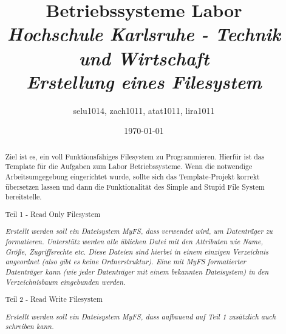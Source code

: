 	\title{Betriebssysteme Labor \\
		\textit{Hochschule Karlsruhe - Technik und Wirtschaft }\\
		\textit{Erstellung eines Filesystem}
	}
	\author{selu1014, zach1011, atat1011, lira1011}
	\date{\today}
	\maketitle
	\newpage

	\renewcommand{\abstractname}{Zielsetzung}
	\begin{abstract}
		Ziel ist es, ein voll Funktionsfähiges Filesystem zu Programmieren. Hierfür ist das Template für die Aufgaben zum Labor Betriebssysteme. Wenn die notwendige Arbeitsumgegebung eingerichtet wurde, sollte sich das Template-Projekt korrekt übersetzen lassen und dann die Funktionalität des Simple and Stupid File System bereitstelle. 
		\newline
		\noindent \begin{center}Teil 1 - Read Only Filesystem \end{center}
		\noindent \textit{Erstellt werden soll ein Dateisystem MyFS, dass verwendet wird, um Datenträger zu formatieren. Unterstütz werden alle üblichen Datei mit den Attributen wie Name, Größe, Zugriffsrechte etc. Diese Dateien sind hierbei in einem einzigen Verzeichnis angeordnet (also gibt es keine Ordnerstruktur). Eine mit MyFS formatierter Datenträger kann (wie jeder Datenträger mit einem bekannten Dateisystem) in den Verzeichnisbaum eingebunden werden.} 
		\newline
		\noindent \begin{center}Teil 2 - Read Write Filesystem \end{center}
		\noindent \textit{Erstellt werden soll ein Dateisystem MyFS, dass aufbauend auf Teil 1 zusätzlich auch schreiben kann.}
		
	\end{abstract}
	\newpage
	\tableofcontents
	\newpage
	\setcounter{page}{4}
	\setcounter{section}{0}
	\ofoot{\thepage{}}
